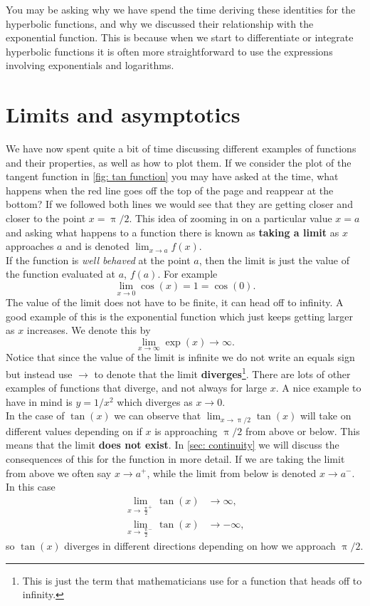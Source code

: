 You may be asking why we have spend the time deriving these identities for the hyperbolic functions, and why we discussed their relationship with the exponential function. This is because when we start to differentiate or integrate hyperbolic functions it is often more straightforward to use the expressions involving exponentials and logarithms. 


\section{Limits and asymptotics}
We have now spent quite a bit of time discussing different examples of functions and their properties, as well as how to plot them. If we consider the plot of the tangent function in \cref{fig: tan function} you may have asked at the time, what happens when the red line goes off the top of the page and reappear at the bottom? If we followed both lines we would see that they are getting closer and closer to the point $x=\uppi/2$. This idea of zooming in on a particular value $x=a$ and asking what happens to a function there is known as \textbf{taking a limit} as $x$ approaches $a$ and is denoted $\lim_{x\to a}f(x)$.\\

If the function is \textit{well behaved} at the point $a$, then the limit is just the value of the function evaluated at $a$, $f(a)$. For example
\begin{equation*}
\lim_{x\to 0}\cos(x)=1=\cos(0).
\end{equation*}
The value of the limit does not have to be finite, it can head off to infinity. A good example of this is the exponential function which just keeps getting larger as $x$ increases. We denote this by
\begin{equation*}
\lim_{x\to \infty}\exp(x)\to \infty.
\end{equation*}
Notice that since the value of the limit is infinite we do not write an equals sign but instead use $\to$ to denote that the limit \textbf{diverges}\footnote{This is just the term that mathematicians use for a function that heads off to infinity.}. There are lots of other examples of functions that diverge, and not always for large $x$. A nice example to have in mind is $y=1/x^{2}$ which diverges as $x\to 0$.\\

In the case of $\tan(x)$ we can observe that $\lim_{x\to \uppi/2}\tan(x)$ will take on different values depending on if $x$ is approaching $\uppi/2$ from above or below. This means that the limit \textbf{does not exist}. In \cref{sec: continuity} we will discuss the consequences of this for the function in more detail. If we are taking the limit from above we often say $x\to a^{+}$, while the limit from below is denoted $x\to a^{-}$. In this case
\begin{align*}
\lim_{x\to \frac{\uppi}{2}^{+}}\tan(x)&\to \infty,\\
\lim_{x\to \frac{\uppi}{2}^{-}}\tan(x)&\to -\infty,
\end{align*}
so $\tan(x)$ diverges in different directions depending on how we approach $\uppi/2$.

